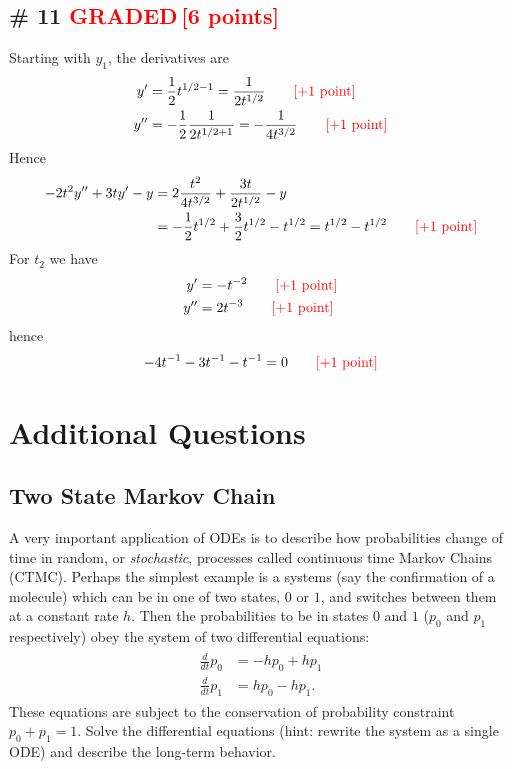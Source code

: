 \documentclass[12pt,letterpaper]{exam}
\newcommand{\grade}{\textcolor{red}{GRADED}}
\newcommand{\pts}[1]{\textcolor{red}{[#1]}}
\begin{document}
\subsection*{\# 11 \grade \,\pts{6 points}}
Starting with $y_1$, the derivatives are
\begin{align}
y' &= \frac{1}{2}t^{1/2-1} = \frac{1}{2t^{1/2}} \quad\quad \text{\pts{+1 point}}\\
y'' &= -\frac{1}{2} \frac{1}{2t^{1/2+1}} = -\frac{1}{4t^{3/2}} \quad\quad \text{\pts{+1 point}}
\end{align}
Hence 
\begin{align}
-2t^2y'' + 3ty' - y &= 2\frac{t^2}{4t^{3/2}}  +\frac{3t}{2t^{1/2}} - y\\
&= -\frac{1}{2}t^{1/2} + \frac{3}{2}t^{1/2} - t^{1/2} = t^{1/2} - t^{1/2} \quad\quad \text{\pts{+1 point}}
\end{align}
For $t_2$ we have
\begin{align}
y' &=-t^{-2}  \quad\quad \text{\pts{+1 point}}\\
y'' &= 2 t^{-3} \quad\quad \text{\pts{+1 point}}
\end{align}
hence 
\begin{align}
-4t^{-1} - 3t^{-1}- t^{-1} = 0  \quad\quad \text{\pts{+1 point}}
\end{align}


\section{Additional Questions}


\subsection*{Two State Markov Chain}
A very important application of ODEs is to describe how probabilities change of time in random, or \emph{stochastic}, processes called continuous time Markov Chains (CTMC). Perhaps the simplest example is a systems (say the confirmation of a molecule) which can be in one of two states, $0$ or $1$, and switches between them at a constant rate $h$. Then the probabilities to be in states $0$ and $1$ ($p_0$ and $p_1$ respectively) obey the system of two differential equations: 
\begin{align}\label{eq:2state}
\begin{split}
\frac{d}{dt}p_0 &=  -hp_0 + h p_1 \\
\frac{d}{dt}p_1 &=  h p_0  - h p_1. 
\end{split}
\end{align}
These equations are subject to the conservation of probability constraint $p_0 + p_1 = 1$. Solve the differential equations (hint: rewrite the system as a single ODE) and describe the long-term behavior. 
\end{document}
